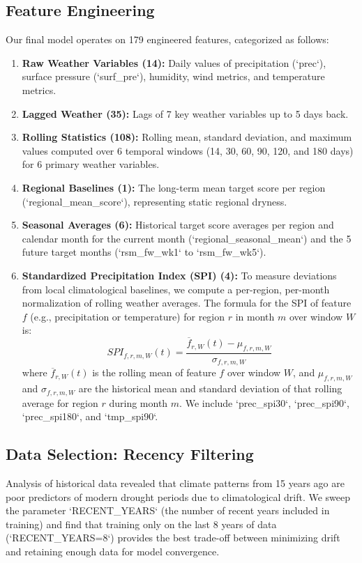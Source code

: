 \documentclass[conference]{IEEEtran}
\begin{document}
\subsection{Feature Engineering}
Our final model operates on 179 engineered features, categorized as follows:
\begin{enumerate}
    \item \textbf{Raw Weather Variables (14):} Daily values of precipitation (`prec`), surface pressure (`surf\_pre`), humidity, wind metrics, and temperature metrics.
    \item \textbf{Lagged Weather (35):} Lags of 7 key weather variables up to 5 days back.
    \item \textbf{Rolling Statistics (108):} Rolling mean, standard deviation, and maximum values computed over 6 temporal windows (14, 30, 60, 90, 120, and 180 days) for 6 primary weather variables.
    \item \textbf{Regional Baselines (1):} The long-term mean target score per region (`regional\_mean\_score`), representing static regional dryness.
    \item \textbf{Seasonal Averages (6):} Historical target score averages per region and calendar month for the current month (`regional\_seasonal\_mean`) and the 5 future target months (`rsm\_fw\_wk1` to `rsm\_fw\_wk5`).
    \item \textbf{Standardized Precipitation Index (SPI) (4):} To measure deviations from local climatological baselines, we compute a per-region, per-month normalization of rolling weather averages. The formula for the SPI of feature $f$ (e.g., precipitation or temperature) for region $r$ in month $m$ over window $W$ is:
    \begin{equation}
        SPI_{f, r, m, W}(t) = \frac{\overline{f}_{r, W}(t) - \mu_{f, r, m, W}}{\sigma_{f, r, m, W}}
    \end{equation}
    where $\overline{f}_{r, W}(t)$ is the rolling mean of feature $f$ over window $W$, and $\mu_{f, r, m, W}$ and $\sigma_{f, r, m, W}$ are the historical mean and standard deviation of that rolling average for region $r$ during month $m$. We include `prec\_spi30`, `prec\_spi90`, `prec\_spi180`, and `tmp\_spi90`.
\end{enumerate}

\subsection{Data Selection: Recency Filtering}
Analysis of historical data revealed that climate patterns from 15 years ago are poor predictors of modern drought periods due to climatological drift. We sweep the parameter `RECENT\_YEARS` (the number of recent years included in training) and find that training only on the last 8 years of data (`RECENT\_YEARS=8`) provides the best trade-off between minimizing drift and retaining enough data for model convergence.
\end{document}
